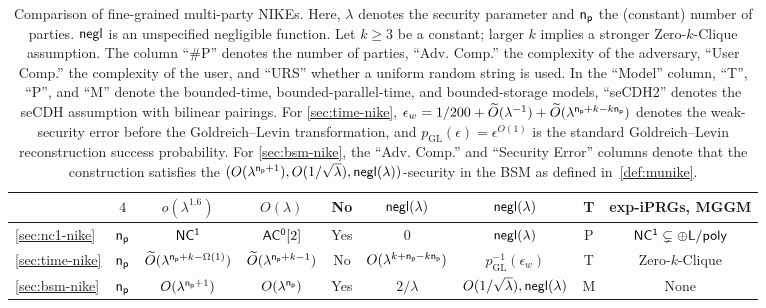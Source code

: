 \begin{table}[h]
\begin{tabular}{|l|c|c|c|c|c|c|c|c|}
& $4$ 
& $o(\lambda^{1.6})$ 
& $O(\lambda)$ 
& No 
& $\mathsf{negl}(\lambda)$ 
& $\mathsf{negl}(\lambda)$ 
& T 
& exp-iPRGs, MGGM \\ 
\hline


\cref{sec:nc1-nike} 
& $\mathsf{n_p}$ 
& $\mathsf{NC^1}$ 
& $\mathsf{AC^0}[2]$ 
& Yes 
& $0$ 
& $\mathsf{negl}(\lambda)$ 
& P 
& $\mathsf{NC^1} \subsetneq {\sf \oplus L/poly}$ \\ 
\hline

\cref{sec:time-nike} 
& $\mathsf{n_p}$ 
& $\widetilde{O}(\lambda^{\mathsf{n_p}+k-\Omega(1)})$
& $\widetilde{O}(\lambda^{\mathsf{n_p}+k-1})$
& No 
& $O(\lambda^{k+\mathsf{n_p}-k\mathsf{n_p}})$  
& $p_{\mathrm{GL}}^{-1}(\epsilon_w)$
& T 
& Zero-$k$-Clique \\ 
\hline

\cref{sec:bsm-nike} 
& $\mathsf{n_p}$ 
& $O(\lambda^{\mathsf{n_p}+1})$ 
& $O(\lambda^{\mathsf{n_p}})$ 
& Yes 
& $2/\lambda$ 
& $O(1/\sqrt{\lambda}), \mathsf{negl}(\lambda)$
& M 
& None \\ 
\hline

\end{tabular}
\caption{Comparison of fine-grained multi-party NIKEs. 
Here, $\lambda$ denotes the security parameter and $\mathsf{n_p}$ the (constant) number of parties. 
$\mathsf{negl}$ is an unspecified negligible function. 
Let $k \ge 3$ be a constant; larger $k$ implies a stronger Zero-$k$-Clique assumption. 
The column ``\#P'' denotes the number of parties, 
``Adv. Comp.'' the complexity of the adversary, ``User Comp.'' the complexity of the user, 
and ``URS'' whether a uniform random string is used. 
In the ``Model'' column, ``T'', ``P'', and ``M'' denote the bounded-time, bounded-parallel-time, and bounded-storage models, ``seCDH2'' denotes the seCDH assumption with bilinear pairings.
For \cref{sec:time-nike}, $\epsilon_w=1/200+\widetilde{O}(\lambda^{-1})+\widetilde{O}(\lambda^{\mathsf{n_p}+k-k\mathsf{n_p}})$ denotes the weak-security error before the Goldreich--Levin transformation, and $p_{\mathrm{GL}}(\epsilon)=\epsilon^{O(1)}$ is the standard Goldreich--Levin reconstruction success probability.
For \cref{sec:bsm-nike}, the ``Adv. Comp.'' and ``Security Error'' columns denote that the construction satisfies the $(O(\lambda^{{\mathsf{n_p}+1}}), O(1/\sqrt{\lambda}), \mathsf{negl}(\lambda))$-security in the BSM as defined in~\cref{def:munike}.
}
\label{fig:comparison-muke}
\end{table}

